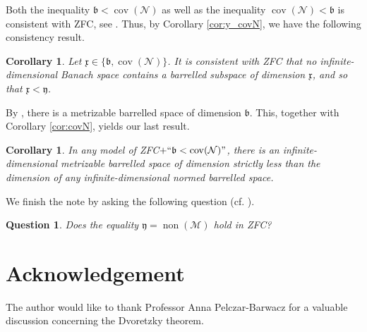 \documentclass[a4paper,11pt,fleqn]{amsart}
\newtheorem{question}[theorem]{Question}
\newtheorem{corollary}[theorem]{Corollary}
\theoremstyle{definition}
\theoremstyle{remark}
\numberwithin{equation}{section}
\newcommand{\frakb}{\mathfrak{b}}
\newcommand{\frakx}{\mathfrak{x}}
\newcommand{\fraky}{\mathfrak{y}}
\newcommand{\mM}{\mathcal{M}}
\newcommand{\nN}{\mathcal{N}}
\DeclareMathOperator{\cov}{cov}
\DeclareMathOperator{\non}{non}
\begin{document}
Both the inequality $\frakb<\cov(\nN)$ as well as the inequality $\cov(\nN)<\frakb$ is consistent with \textsf{ZFC}, see \cite[Sections 7.5--7.6]{BJ95}. Thus, by Corollary \ref{cor:y_covN}, we have the following consistency result.

\begin{corollary}\label{cor:b_covN_y}
    Let $\frakx\in\!\big\{\frakb,\cov(\nN)\big\}$. It is consistent with \textup{\textsf{ZFC}} that no infinite-dimensional Banach space contains a barrelled subspace of dimension $\frakx$, and so that $\frakx<\fraky$.
\end{corollary}

By \cite[Theorem 6]{SRS95}, there is a metrizable barrelled space of dimension $\frakb$. This, together with Corollary \ref{cor:covN}, yields our last result.

\begin{corollary}
    In any model of \textup{\textsf{ZFC}}$+``\frakb<\cov(\nN)"$, there is an infinite-dimensional metrizable barrelled space of dimension strictly less than the dimension of any infinite-dimensional normed barrelled space. 
\end{corollary}

We finish the note by asking the following question (cf. \cite[Question 4.14]{BS24}).

\begin{question}
Does the equality $\fraky=\non(\mM)$ hold in \textup{\textsf{ZFC}}?
\end{question}

\section*{Acknowledgement}

The author would like to thank Professor Anna Pelczar-Barwacz for a valuable discussion concerning the Dvoretzky theorem.
\end{document}
